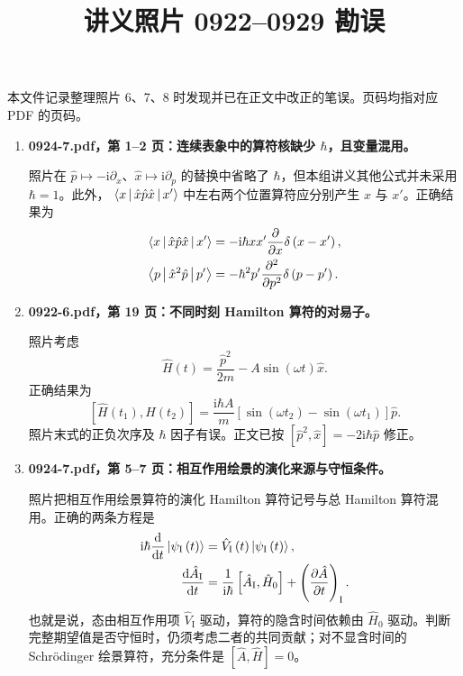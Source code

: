\documentclass[UTF8,12pt,a4paper,fontset=fandol]{ctexart}
\title{讲义照片 0922--0929 勘误}
\author{}
\date{}
\begin{document}
\maketitle

本文件记录整理照片 6、7、8 时发现并已在正文中改正的笔误。页码均指对应 PDF 的页码。

\begin{enumerate}
\item \textbf{0924-7.pdf，第 1--2 页：连续表象中的算符核缺少 $\hbar$，且变量混用。}

照片在 $\hat p\mapsto-\mathrm{i}\partial_x$、$\hat x\mapsto\mathrm{i}\partial_p$ 的替换中省略了 $\hbar$，但本组讲义其他公式并未采用 $\hbar=1$。此外，
$\Braket{x|\hat x\hat p\hat x|x'}$ 中左右两个位置算符应分别产生 $x$ 与 $x'$。正确结果为
\begin{align}
\Braket{x|\hat x\hat p\hat x|x'}
&=-\mathrm{i}\hbar xx'\frac{\partial}{\partial x}\delta\left(x-x'\right),\\
\Braket{p|\hat x^2\hat p|p'}
&=-\hbar^2p'\frac{\partial^2}{\partial p^2}\delta\left(p-p'\right).
\end{align}

\item \textbf{0922-6.pdf，第 19 页：不同时刻 Hamilton 算符的对易子。}

照片考虑
\begin{equation}
\hat H\left(t\right)=\frac{\hat p^2}{2m}-A\sin\left(\omega t\right)\hat x.
\end{equation}
正确结果为
\begin{equation}
\left[\hat H\left(t_1\right),\hat H\left(t_2\right)\right]
=\frac{\mathrm{i}\hbar A}{m}
\left[\sin\left(\omega t_2\right)-\sin\left(\omega t_1\right)\right]\hat p.
\end{equation}
照片末式的正负次序及 $\hbar$ 因子有误。正文已按
$\left[\hat p^2,\hat x\right]=-2\mathrm{i}\hbar\hat p$ 修正。

\item \textbf{0924-7.pdf，第 5--7 页：相互作用绘景的演化来源与守恒条件。}

照片把相互作用绘景算符的演化 Hamilton 算符记号与总 Hamilton 算符混用。正确的两条方程是
\begin{align}
\mathrm{i}\hbar\frac{\mathrm{d}}{\mathrm{d}t}\Ket{\psi_{\mathrm I}\left(t\right)}
&=\hat V_{\mathrm I}\left(t\right)\Ket{\psi_{\mathrm I}\left(t\right)},\\
\frac{\mathrm{d}\hat A_{\mathrm I}}{\mathrm{d}t}
&=\frac{1}{\mathrm{i}\hbar}\left[\hat A_{\mathrm I},\hat H_0\right]
+\left(\frac{\partial\hat A}{\partial t}\right)_{\mathrm I}.
\end{align}
也就是说，态由相互作用项 $\hat V_{\mathrm I}$ 驱动，算符的隐含时间依赖由 $\hat H_0$ 驱动。判断完整期望值是否守恒时，仍须考虑二者的共同贡献；对不显含时间的 Schr\"odinger 绘景算符，充分条件是
$\left[\hat A,\hat H\right]=0$。


\end{enumerate}
\end{document}
